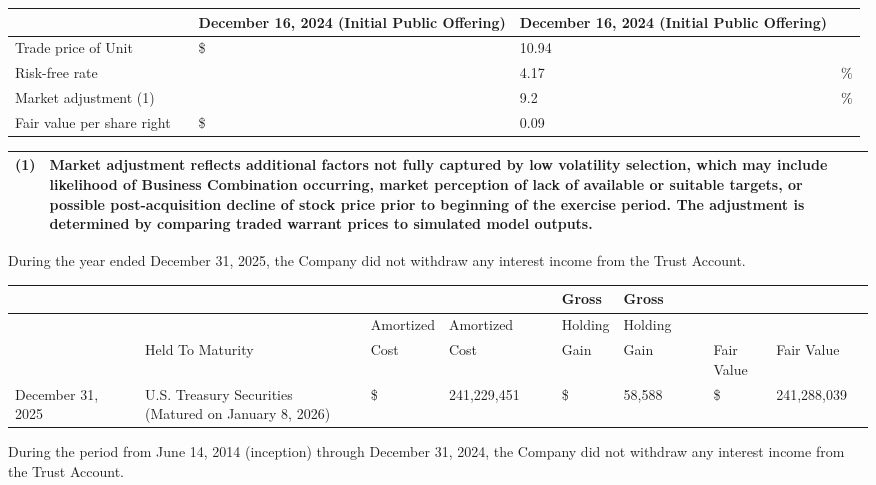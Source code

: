 \documentclass[11pt,a4paper]{article}
\begin{document}
\begin{table}[h]
\begin{tabular}{|l|l|l|l|l|}
\hline
 &  & \textbf{December 16, 2024}  \textbf{(Initial Public Offering)} & \textbf{December 16, 2024}  \textbf{(Initial Public Offering)} &  \\ \hline
Trade price of Unit &  & \$ & 10.94 &  \\ \hline
Risk-free rate &  &  & 4.17 & \% \\ \hline
Market adjustment (1) &  &  & 9.2 & \% \\ \hline
Fair value per share right &  & \$ & 0.09 &  \\ \hline
\end{tabular}
\end{table}

\begin{table}[h]
\begin{tabular}{|l|l|}
\hline
(1) & Market adjustment reflects additional factors not fully captured by low volatility selection, which may include likelihood of Business Combination occurring, market perception of lack of available or suitable targets, or possible post-acquisition decline of stock price prior to beginning of the exercise period. The adjustment is determined by comparing traded warrant prices to simulated model outputs. \\ \hline
\end{tabular}
\end{table}

During the year ended December 31, 2025, the Company did not withdraw any interest income from the Trust Account.

\begin{table}[h]
\begin{tabular}{|l|l|l|l|l|l|l|l|l|l|l|l|l|l|l|l|}
\hline
 &  &  &  &  &  &  &  &  & Gross & Gross &  &  &  &  &  \\ \hline
 &  &  &  &  & Amortized & Amortized &  &  & Holding & Holding &  &  &  &  &  \\ \hline
 &  &  & Held To Maturity &  & Cost & Cost &  &  & Gain & Gain &  &  & Fair Value & Fair Value &  \\ \hline
December 31, 2025 &  &  & U.S. Treasury Securities (Matured on January 8, 2026) &  & \$ & 241,229,451 &  &  & \$ & 58,588 &  &  & \$ & 241,288,039 &  \\ \hline
\end{tabular}
\end{table}

During the period from June 14, 2014 (inception) through December 31, 2024, the Company did not withdraw any interest income from the Trust Account.
\end{document}
